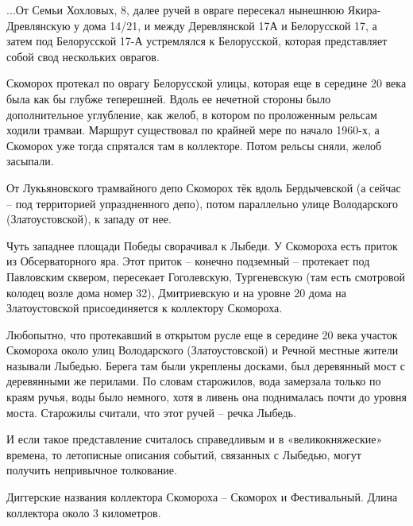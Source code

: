 ...От Семьи Хохловых, 8, далее ручей в овраге пересекал нынешнюю Якира-Древлянскую у дома 14/21, и между Деревлянской 17А и Белорусской 17, а затем под Белорусской 17-А устремлялся к Белорусской, которая представляет собой свод нескольких оврагов.

Скоморох протекал по оврагу Белорусской улицы, которая еще в середине 20 века была как бы глубже теперешней. Вдоль ее нечетной стороны было дополнительное углубление, как желоб, в котором по проложенным рельсам ходили трамваи. Маршрут существовал по крайней мере по начало 1960-х, а Скоморох уже тогда спрятался там в коллекторе. Потом рельсы сняли, желоб засыпали.

От Лукьяновского трамвайного депо Скоморох тёк вдоль Бердычевской (а сейчас – под территорией упраздненного депо), потом параллельно улице Володарского (Златоустовской), к западу от нее. 

Чуть западнее площади Победы сворачивал к Лыбеди. У Скомороха есть приток из Обсерваторного яра. Этот приток – конечно подземный – протекает под Павловским сквером, пересекает Гоголевскую, Тургеневскую (там есть смотровой колодец возле дома номер 32), Дмитриевскую и на уровне 20 дома на Златоустовской присоединяется к коллектору Скомороха.

Любопытно, что протекавший в открытом русле еще в середине 20 века участок Скомороха около улиц Володарского (Златоустовской) и Речной местные жители называли Лыбедью. Берега там были укреплены досками, был деревянный мост с деревянными же перилами. По словам старожилов, вода замерзала только по краям ручья, воды было немного, хотя в ливень она поднималась почти до уровня моста. Старожилы считали, что этот ручей – речка Лыбедь. 

И если такое представление считалось справедливым и в «великокняжеские» времена, то летописные описания событий, связанных с Лыбедью, могут получить непривычное толкование.

Диггерские названия коллектора Скомороха – Скоморох и Фестивальный. Длина коллектора около 3 километров.

